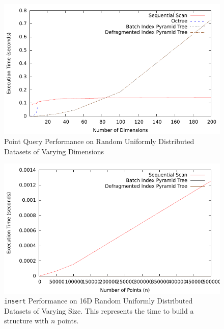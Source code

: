 \begin{figure}
	\centering
	\includegraphics[scale=0.8]{figures/performance_analysis/iteration_1/all_pquery_randuniform.pdf}
	\caption{Point Query Performance on Random Uniformly Distributed Datasets of Varying Dimensions}
	\label{fig:perf1-allpquery-d}
\end{figure}

\begin{figure}
	\centering
	\includegraphics[scale=0.8]{figures/performance_analysis/iteration_1/all_insert_sizevary_average.pdf}
	\caption{\texttt{insert} Performance on 16D Random Uniformly Distributed Datasets of Varying Size. This represents the time to build a structure with $n$ points.}
	\label{fig:perf1-allinsert-n}
\end{figure}

